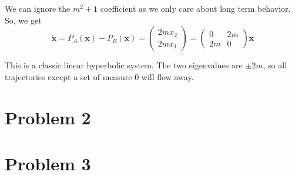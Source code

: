 \documentclass[psamsfonts]{amsart}
\theoremstyle{definition}
\theoremstyle{remark}
\numberwithin{equation}{section}
\begin{document}
We can ignore the $m^2 + 1$ coefficient as we only care about long term behavior.
So, we get
\[
\dot{\mathbf{x}} = 
P_A(\mathbf{x}) - P_B(\mathbf{x}) = 
\left(
\begin{matrix}
2mx_2 \\ 2mx_1
\end{matrix}
\right) 
= 
\left(
\begin{matrix}
0 & 2m \\
2m & 0
\end{matrix}
\right)
\mathbf{x}
\]


This is a classic linear hyperbolic system. The two eigenvalues are $\pm 2m$, so all trajectories except a set of measure $0$ will flow away.


\section{Problem 2}



\section{Problem 3}
\end{document}
